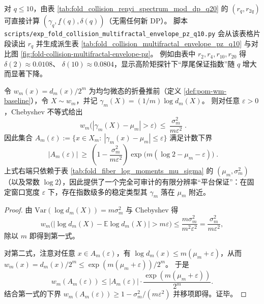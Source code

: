 \begin{remark}[可复核读出：\texorpdfstring{$q\le 10$}{q<=10} 的下包络点与两侧包络图]\label{rem:pom-spectrum-pz-numerics}
对 \(q\le 10\)，由表 \ref{tab:fold_collision_renyi_spectrum_mod_dp_q20} 的 \((r_q,r_{2q})\) 可直接计算
\(
(\gamma_q,\underline f(q),\delta(q))
\)（无需任何新 DP）。
脚本 \texttt{scripts/exp\_fold\_collision\_multifractal\_envelope\_pz\_q10.py} 会从该表格片段读出 \(r_q\) 并生成派生表 \ref{tab:fold_collision_multifractal_envelope_pz_q10} 与对比图 \ref{fig:fold-collision-multifractal-envelope-pz}。
例如由表中 \(r_2,r_4,r_{10},r_{20}\) 得
\(
\delta(2)\approx 0.0108
\)、
\(
\delta(10)\approx 0.0804
\)，显示高阶矩探针下“厚尾保证指数”随 \(q\) 增大而显著下降。


\end{remark}

\begin{proposition}\label{prop:pom-spectrum-finite-m-plateau}
令 \(w_m(x)=d_m(x)/2^m\) 为均匀微态的折叠推前（定义 \ref{def:pom-wm-baseline}），令 \(X\sim w_m\)，并记
\(
\gamma_m(X)=(1/m)\log d_m(X)
\)。
则对任意 \(\varepsilon>0\)，Chebyshev 不等式给出
\[
\boxed{\;
w_m\!\bigl(|\gamma_m(X)-\mu_m|>\varepsilon\bigr)\ \le\ \frac{\sigma_m^2}{m\varepsilon^2}\; }.
\]
因此集合
\(
A_m(\varepsilon):=\{x\in X_m:\ |\gamma_m(x)-\mu_m|\le \varepsilon\}
\)
满足计数下界
\[
\boxed{\;
|A_m(\varepsilon)|
\ \ge\
\left(1-\frac{\sigma_m^2}{m\varepsilon^2}\right)
\exp\!\bigl(m(\log 2-\mu_m-\varepsilon)\bigr)\; }.
\]
上式右端只依赖于表 \ref{tab:fold_fiber_log_moments_mu_sigma} 的 \((\mu_m,\sigma_m^2)\)（以及常数 \(\log 2\)），因此提供了一个完全可审计的有限分辨率“平台保证”：在固定窗口宽度 \(\varepsilon\) 下，存在指数级多的稳定类型其 \(\gamma_m\) 落在 \(\mu_m\) 附近。
\end{proposition}

\begin{proof}
由 \(\mathrm{Var}(\log d_m(X))=m\sigma_m^2\) 与 Chebyshev 得
\[
w_m\bigl(|\log d_m(X)-\mathbb{E}\log d_m(X)|>m\varepsilon\bigr)
\le \frac{m\sigma_m^2}{m^2\varepsilon^2}
=\frac{\sigma_m^2}{m\varepsilon^2},
\]
除以 \(m\) 即得到第一式。
\par
对第二式，注意对任意 \(x\in A_m(\varepsilon)\)，有
\(
\log d_m(x)\le m(\mu_m+\varepsilon)
\)，从而
\(
w_m(x)=d_m(x)/2^m\le \exp(m(\mu_m+\varepsilon))/2^m
\)。
于是
\[
w_m(A_m(\varepsilon))
\le |A_m(\varepsilon)|\cdot \frac{\exp(m(\mu_m+\varepsilon))}{2^m}.
\]
结合第一式的下界 \(w_m(A_m(\varepsilon))\ge 1-\sigma_m^2/(m\varepsilon^2)\) 并移项即得。证毕。
\end{proof}

